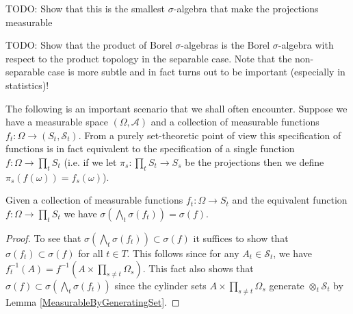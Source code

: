 TODO: Show that this is the smallest $\sigma$-algebra that make the
projections measurable

TODO: Show that the product of Borel $\sigma$-algebras is the Borel
$\sigma$-algebra with respect to the product topology in the separable
case.  Note that the non-separable case is more subtle and in fact
turns out to be important (especially in statistics)!

The following is an important scenario that we shall often encounter.
Suppose we have a measurable space $(\Omega, \mathcal{A})$ and a
collection of measurable functions $f_t : \Omega \to (S_t,
\mathcal{S}_t)$.  From a purely set-theoretic point of view this
specification of functions is in fact
equivalent to the specification of a single function $f : \Omega \to
\prod_t S_t$ (i.e. if we let $\pi_s : \prod_t S_t \to S_s$ be the
projections then we define $\pi_s(f(\omega)) = f_s(\omega)$).  

\begin{lem}Given a collection of measurable functions $f_t : \Omega
  \to S_t$ and the equivalent function $f : \Omega \to \prod_t S_t$ we
  have $\sigma(\bigwedge_t \sigma(f_t)) = \sigma(f)$.
\end{lem}
\begin{proof}
To see that $\sigma(\bigwedge_t \sigma(f_t)) \subset \sigma(f)$ it
suffices to show that $\sigma(f_t) \subset \sigma(f)$ for all $t \in
T$.  This follows since for any $A_t \in \mathcal{S}_t$, we have
$f_t^{-1}(A) = f^{-1}(A \times  \prod_{s \neq t} \Omega_s)$.  This
fact also shows that $\sigma(f) \subset \sigma(\bigwedge_t
\sigma(f_t))$ since the cylinder sets $A \times  \prod_{s \neq t}
\Omega_s$ generate $\otimes_t \mathcal{S}_t$ by Lemma \ref{MeasurableByGeneratingSet}.
\end{proof}

